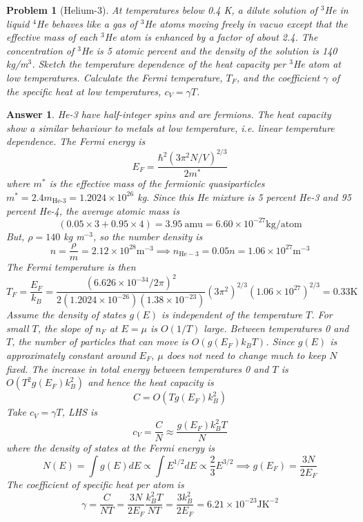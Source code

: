 \documentclass[a4paper]{article}
\theoremstyle{new2}
\newtheorem{ans}{Answer}[section]
\theoremstyle{new}
\newtheorem{qns}{Problem}[section]
\begin{document}
\begin{qns}[Helium-3]
At temperatures below 0.4 K, a dilute solution of $^3$He in liquid $^4$He behaves like a gas of $^3$He atoms moving freely in vacuo except that the effective mass of each $^3$He atom is enhanced by a factor of about 2.4. The concentration of $^3$He is 5 atomic percent and the density of the solution is 140 kg/m$^3$. Sketch the temperature dependence of the heat capacity per $^3$He atom at low temperatures. Calculate the Fermi temperature, $T_F$, and the coefficient $\gamma$ of the specific heat at low temperatures, $c_V = \gamma T$.
\end{qns}
\begin{ans}
He-3 have half-integer spins and are fermions. The heat capacity show a similar behaviour to metals at low temperature, i.e. linear temperature dependence. The Fermi energy is
$$E_F=\frac{\hbar^2(3\pi^2N/V)^{2/3}}{2m^*}$$
where $m^*$ is the effective mass of the fermionic quasiparticles $m^*=2.4m_{\text{He-3}}=1.2024\times10^{26}$ kg. Since this He mixture is 5 percent He-3 and 95 percent He-4, the average atomic mass is 
$$(0.05\times 3+0.95\times 4)=3.95~\text{amu}=6.60\times10^{-27}\text{kg/atom}$$
But, $\rho=140$ kg m$^{-3}$, so the number density is 
$$n=\frac{\rho}{m}=2.12\times10^{28}\text{m}^{-3}\implies n_{\text{He}-3}=0.05 n=1.06\times10^{27}\text{m}^{-3}$$
The Fermi temperature is then
$$T_F=\frac{E_F}{k_B}=\frac{(6.626\times10^{-34}/2\pi)^2}{2(1.2024\times10^{-26})(1.38\times10^{-23})}(3\pi^2)^{2/3}(1.06\times10^{27})^{2/3}=0.33\text{K}$$
Assume the density of states $g(E)$ is independent of the temperature $T$. For small $T$, the slope of $n_F$ at $E=\mu$ is $O(1/T)$ large. Between temperatures 0 and $T$, the number of particles that can move is $O(g(E_F)k_BT)$. Since $g(E)$ is approximately constant around $E_F$, $\mu$ does not need to change much to keep $N$ fixed. The increase in total energy between temperatures 0 and $T$ is $O(T^2g(E_F)k_B^2)$ and hence the heat capacity is
$$C=O(Tg(E_F)k_B^2)$$
Take $c_V=\gamma T$, LHS is
$$c_V=\frac{C}{N}\approx\frac{g(E_F)k_B^2T}{N}$$
where the density of states at the Fermi energy is
$$N(E)=\int g(E)dE\propto\int E^{1/2}dE\propto\frac{2}{3}E^{3/2}\implies g(E_F)=\frac{3N}{2E_F}$$
The coefficient of specific heat per atom is
$$\gamma=\frac{C}{NT}=\frac{3N}{2E_F}\frac{k_B^2T}{NT}=\frac{3k_B^2}{2E_F}=6.21\times10^{-23}\text{JK}^{-2}$$
\end{ans}
\end{document}
